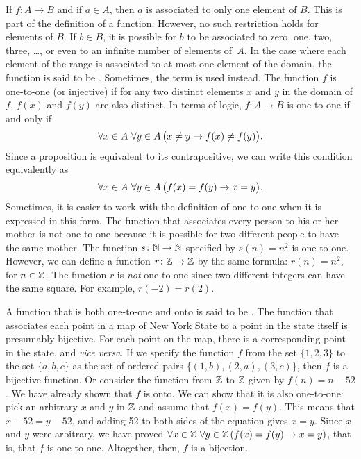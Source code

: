 If $f\colon A\to B$ and if $a\in A$, then $a$ is associated to
only one element of $B$.  This is part of the definition of
a function.  However, no such restriction holds for elements
of $B$.  If $b\in B$, it is possible for $b$ to be associated
to zero, one, two, three, \dots, or even to an infinite
number of elements of~$A$.  In the case where each element of
the range is associated to at most one element of the domain,
the function is said to be .  Sometimes,
the term  is used instead.  The function $f$
is one-to-one (or injective) if for any two distinct elements $x$ and $y$ in
the domain of $f$, $f(x)$ and $f(y)$ are also distinct.  In
terms of logic, $f\colon A\to B$ is one-to-one if and only if
\[\forall x\in A\,\,\forall y\in A\,\big(x\not=y\rightarrow f(x)\not=f(y)\big).\]
Since a proposition is equivalent to its contrapositive,
we can write this condition equivalently as
\[\forall x\in A\,\,\forall y\in A\,\big(f(x)=f(y)\rightarrow x=y\big).\]
Sometimes, it is easier to work with the definition of one-to-one
when it is expressed in this form.
The function that associates every person to his or her mother is
not one-to-one because it is possible for two different people
to have the same mother.  The function $s\colon{\mathbb N}\to{\mathbb N}$ specified
by $s(n)=n^2$ is one-to-one.  However,
we can define a function $r\colon{\mathbb Z}\to{\mathbb Z}$ by the same formula:
$r(n)=n^2$, for $n\in{\mathbb Z}$.  The function $r$ is \emph{not}
one-to-one since two different integers can have the same square.
For example, $r(-2)=r(2)$.

A function that is both one-to-one and onto is said to be
.  The function that associates each point in
a map of New York State to a point in the state itself is
presumably bijective.  For each point on the map, there is
a corresponding point in the state, and \textit{vice versa}.
If we specify the function $f$ from the set $\{1,2,3\}$ to the 
set $\{a,b,c\}$ as the set of ordered pairs
$\{(1,b),(2,a),(3,c)\}$, then $f$ is a bijective function.
Or consider the function from ${\mathbb Z}$ to ${\mathbb Z}$ given by $f(n) =
n-52$.  We have already shown that $f$ is onto.  We can show
that it is also one-to-one: pick an arbitrary $x$ and $y$
in ${\mathbb Z}$ and assume that $f(x) = f(y)$.  This means that
$x-52 = y-52$, and adding 52 to both sides of the equation
gives $x=y$.  Since $x$ and $y$ were arbitrary, we have proved
$\forall x\in {\mathbb Z}\,\,\forall y\in {\mathbb Z}\,(f(x)=f(y)\rightarrow x=y)$,
that is, that $f$ is one-to-one.  Altogether, then, $f$ is a bijection.


\medbreak

